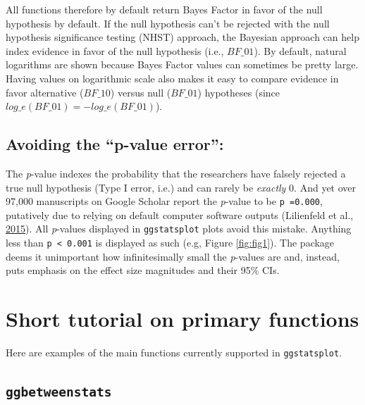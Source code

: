 \documentclass[
]{article}
\begin{document}
All functions therefore by default return Bayes Factor
in favor of the null hypothesis by default. If the null hypothesis can't be
rejected with the null hypothesis significance testing (NHST) approach, the
Bayesian approach can help index evidence in favor of the null hypothesis (i.e.,
\(BF\_{01}\)). By default, natural logarithms are shown because Bayes Factor
values can sometimes be pretty large. Having values on logarithmic scale also
makes it easy to compare evidence in favor alternative (\(BF\_{10}\)) versus null
(\(BF\_{01}\)) hypotheses (since \(log\_{e}(BF\_{01}) = - log\_{e}(BF\_{01})\)).

\hypertarget{avoiding-the-p-value-error}{%
\subsection{\texorpdfstring{Avoiding the \textbf{``p-value error''}:}{Avoiding the ``p-value error'':}}\label{avoiding-the-p-value-error}}

The \emph{p}-value indexes the probability that the researchers have falsely rejected
a true null hypothesis (Type I error, i.e.) and can rarely be \emph{exactly} 0. And
yet over 97,000 manuscripts on Google Scholar report the \emph{p}-value to be \texttt{p\ =0.000},
putatively due to relying on default computer software outputs
(Lilienfeld et al., \protect\hyperlink{ref-lilienfeldFiftyPsychologicalPsychiatric2015}{2015}). All \emph{p}-values displayed in
\texttt{ggstatsplot} plots avoid this mistake. Anything less than \texttt{p\ \textless{}\ 0.001} is
displayed as such (e.g, Figure \ref{fig:fig1}). The package deems it unimportant how
infinitesimally small the \emph{p}-values are and, instead, puts emphasis on the
effect size magnitudes and their 95\% CIs.

\newpage

\hypertarget{short-tutorial-on-primary-functions}{%
\section{Short tutorial on primary functions}\label{short-tutorial-on-primary-functions}}

Here are examples of the main functions currently supported in \texttt{ggstatsplot}.

\hypertarget{ggbetweenstats}{%
\subsection{\texorpdfstring{\texttt{ggbetweenstats}}{ggbetweenstats}}\label{ggbetweenstats}}
\end{document}
